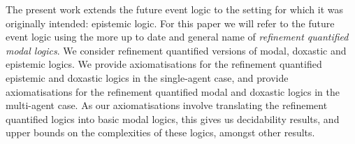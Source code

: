 The present work extends the future event logic to the setting for which it was
originally intended: epistemic logic. For this paper we will refer to the future
event logic using the more up to date and general name of {\em refinement
quantified modal logics}. We consider refinement quantified versions of modal,
doxastic and epistemic logics. We provide axiomatisations for the refinement
quantified epistemic and doxastic logics in the single-agent case, and provide
axiomatisations for the refinement quantified modal and doxastic logics in the
multi-agent case. As our axiomatisations involve translating the refinement
quantified logics into basic modal logics, this gives us decidability results,
and upper bounds on the complexities of these logics, amongst other results.
